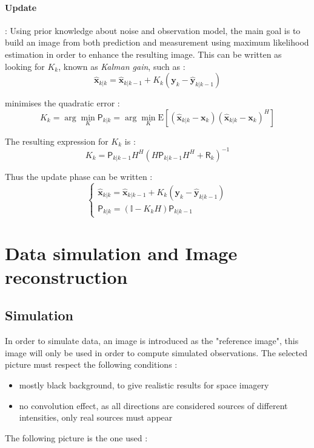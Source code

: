 \documentclass[titlepage]{article}
\newcommand{\autocorr}[1]{\expval{(#1)(#1)^H}}
\renewcommand{\expval}[1]{\text{E}\left[#1\right]}
\newcommand{\R}{\boldsymbol{\mathsf{R}}}
\newcommand{\x}{\boldsymbol{x}}
\newcommand{\y}{\boldsymbol{y}}
\newcommand{\xp}{\widehat{\x}_{k|k-1}}
\newcommand{\xe}{\widehat{\x}_{k|k}}
\newcommand{\yp}{\widehat{\y}_{k|k-1}}
\newcommand{\Pp}{\boldsymbol{\mathsf{P}}_{k|k-1}}
\newcommand{\Pe}{\boldsymbol{\mathsf{P}}_{k|k}}
\begin{document}
	\paragraph{Update} : Using prior knowledge about noise and observation model, the main goal is to build an image from both prediction and measurement using maximum likelihood estimation in order to enhance the resulting image. This can be written as looking for $K_k$, known as \emph{Kalman gain}, such as :
	\begin{equation}
		\xe = \xp + K_k\left(\y_k - \yp\right)
	\end{equation}
	
	minimises the quadratic error :
	\begin{equation}
		K_k = \arg\min_K \Pe = \arg\min_K \autocorr{\xe - \x_k}
	\end{equation}
	
	The resulting expression for $K_k$ is \cite{intro_KF} :
	\begin{equation}
		K_k = \Pp H^H\left(H\Pp H^H + \R_k\right)^{-1}
	\end{equation}

	Thus the update phase can be written :
	\begin{equation}
		\begin{cases}
			\xe = \xp + K_k\left(\y_k - \yp\right) \\
			\Pe = \left(\mathbb{I} - K_kH\right)\Pp
		\end{cases}
	\end{equation}
	
		\section{Data simulation and Image reconstruction}
	\subsection{Simulation}
	
	In order to simulate data, an image is introduced as the "reference image", this image will only be used in order to compute simulated observations. The selected picture must respect the following conditions :
	\begin{itemize}
		\item mostly black background, to give realistic results for space imagery
		\item no convolution effect, as all directions are considered sources of different intensities, only real sources must appear
	\end{itemize}
	The following picture is the one used :
	
\end{document}
